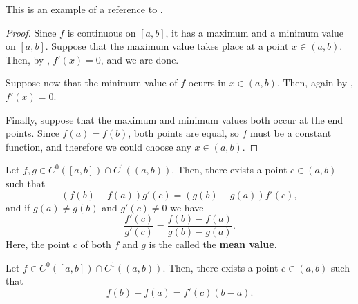 This is an example of a reference to .

\begin{proof}
    Since $f$ is continuous on $[a, b]$, it has a maximum and a minimum value on $[a, b]$. Suppose that the
    maximum value takes place at a point $x\in\left( a, b \right) $. Then, by , $f'\left( x \right) = 0$, and we are done.

    \noindent Suppose now that the minimum value of $f$ ocurrs in $x\in\left( a, b \right)$. Then, again
    by , $f'\left( x \right) = 0$.

    \noindent Finally, suppose that the maximum and minimum values both occur at the end points. Since $f\left( a \right) = f\left( b \right) $, both points are equal, so $f$ must be a constant function, and therefore we
    could choose any $x\in\left( a, b \right) $.
\end{proof}

\begin{theorem}\label{thm:mv-cauchy}
    Let $f, g\in C^0\left( [a, b] \right) \cap C^1\left( \left( a, b \right) \right) $. Then, there exists
    a point $c\in\left( a, b \right) $ such that
    \begin{equation}
        \left( f\left( b \right) - f\left( a \right)  \right)g'\left( c \right) = \left( g\left( b \right) - g\left( a \right)  \right) f'\left( c \right),
    \end{equation}
    and if $g\left( a \right) \neq g\left( b \right)$ and $g'\left( c \right) \neq 0$ we have
    \begin{equation}
        \frac{f'\left( c \right) }{g'\left( c \right) } = \frac{f\left( b \right) - f\left( a \right) }{g\left( b \right) - g\left( a \right) }.
    \end{equation}
    Here, the point $c$ of both $f$ and $g$ is the called the \textbf{mean value}.
\end{theorem}


\begin{theorem}\label{thm:mv-lagrange}
    Let $f\in C^0\left( [a, b] \right) \cap C^1\left( \left( a, b \right)  \right) $. Then, there exists a
    point $c\in\left( a, b \right) $ such that
    \begin{equation}
        f\left( b \right) - f\left( a \right) = f'\left( c \right) \left( b - a \right).
    \end{equation}
\end{theorem}

